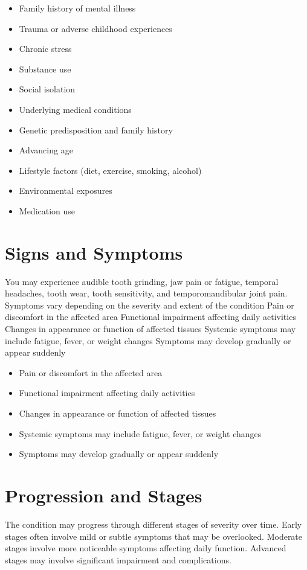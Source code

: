 \begin{itemize}[noitemsep]
  \item Family history of mental illness
  \item Trauma or adverse childhood experiences
  \item Chronic stress
  \item Substance use
  \item Social isolation
  \item Underlying medical conditions
  \item Genetic predisposition and family history
  \item Advancing age
  \item Lifestyle factors (diet, exercise, smoking, alcohol)
  \item Environmental exposures
  \item Medication use
\end{itemize}
\section{Signs and Symptoms}
You may experience audible tooth grinding, jaw pain or fatigue, temporal headaches, tooth wear, tooth sensitivity, and temporomandibular joint pain. Symptoms vary depending on the severity and extent of the condition Pain or discomfort in the affected area Functional impairment affecting daily activities Changes in appearance or function of affected tissues Systemic symptoms may include fatigue, fever, or weight changes Symptoms may develop gradually or appear suddenly

\begin{itemize}[noitemsep]
  \item Pain or discomfort in the affected area
  \item Functional impairment affecting daily activities
  \item Changes in appearance or function of affected tissues
  \item Systemic symptoms may include fatigue, fever, or weight changes
  \item Symptoms may develop gradually or appear suddenly
\end{itemize}
\section{Progression and Stages}
The condition may progress through different stages of severity over time. Early stages often involve mild or subtle symptoms that may be overlooked. Moderate stages involve more noticeable symptoms affecting daily function. Advanced stages may involve significant impairment and complications.
